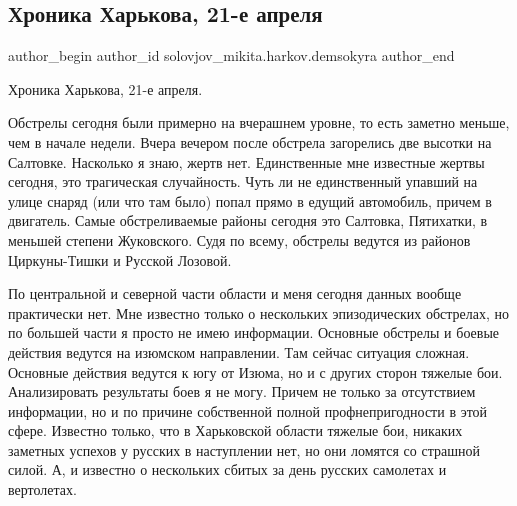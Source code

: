  
 
 
 
 
 
\subsection{Хроника Харькова, 21-е апреля}
\label{sec:21_04_2022.fb.solovjov_mikita.harkov.demsokyra.1.hronika}
 
\ifcmt
 author_begin
   author_id solovjov_mikita.harkov.demsokyra
 author_end
\fi

Хроника Харькова, 21-е апреля. 

Обстрелы сегодня были примерно на вчерашнем уровне, то есть заметно меньше, чем
в начале недели. Вчера вечером после обстрела загорелись две высотки на
Салтовке. Насколько я знаю, жертв нет. Единственные мне известные жертвы
сегодня, это трагическая случайность. Чуть ли не единственный упавший на улице
снаряд (или что там было) попал прямо в едущий автомобиль, причем в двигатель.
Самые обстреливаемые районы сегодня это Салтовка, Пятихатки, в меньшей степени
Жуковского. Судя по всему, обстрелы ведутся из районов Циркуны-Тишки и Русской
Лозовой. 


По центральной и северной части области и меня сегодня данных вообще
практически нет. Мне известно только о нескольких эпизодических обстрелах, но
по большей части я просто не имею информации. Основные обстрелы и боевые
действия ведутся на изюмском направлении. Там сейчас ситуация сложная. Основные
действия ведутся к югу от Изюма, но и с других сторон тяжелые бои.
Анализировать результаты боев я не могу. Причем не только за отсутствием
информации, но и по причине собственной полной профнепригодности в этой сфере.
Известно только, что в Харьковской области тяжелые бои, никаких заметных
успехов у русских в наступлении нет, но они ломятся со страшной силой. А, и
известно о нескольких сбитых за день русских самолетах и вертолетах. 

